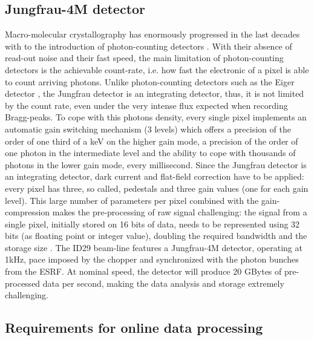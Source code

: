 \documentclass[preprint]{iucr}              %
\begin{document}
\subsection{Jungfrau-4M detector}
Macro-molecular crystallography has enormously progressed in the last decades with to the introduction of photon-counting detectors \cite{pilatus}. 
With their absence of read-out noise and their fast speed, the main limitation of photon-counting detectors is the achievable count-rate, i.e. how fast the electronic of a pixel is able to count arriving photons.
Unlike photon-counting detectors such as the Eiger detector \cite{Eiger}, the Jungfrau detector \cite{jungfrau2016} is an integrating detector, thus, it is not limited by the count rate, even under the very intense flux expected when recording Bragg-peaks.
To cope with this photons density, every single pixel implements an automatic gain switching mechanism (3 levels) which offers a precision of the order of one third of a keV on the higher gain mode, a precision of the order of one photon in the intermediate level and the ability to cope with thousands of photons in the lower gain mode, every millisecond.
Since the Jungfrau detector is an integrating detector, dark current and flat-field correction have to be applied: every pixel has three, so called, pedestals and three gain values (one for each gain level). 
This large number of parameters per pixel combined with the gain-compression makes the pre-processing of raw signal challenging: the signal from a single pixel, initially stored on 16 bits of data, needs to be represented using 32 bits (as floating point or integer value), doubling the required bandwidth and the storage size \cite{jungfrau_PSI}.
The ID29 beam-line features a Jungfrau-4M detector, operating at 1kHz, pace imposed by the chopper and synchronized with the photon bunches from the ESRF.
At nominal speed, the detector will produce 20 GBytes of pre-processed data per second, making the data analysis and storage extremely challenging.

\subsection{Requirements for online data processing}
\end{document}
